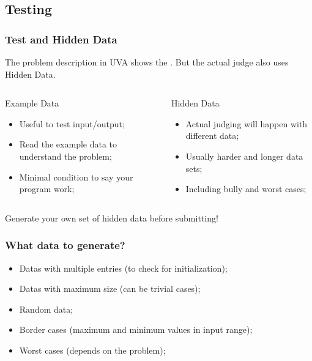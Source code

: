 \documentclass{beamer}
\begin{document}
\subsection{Testing}
\begin{frame}
  \frametitle{Test and Hidden Data}

  The problem description in UVA shows the . But the actual judge also uses \alert{Hidden Data}. 

  \begin{columns}
    \begin{exampleblock}{Example Data}
      \begin{itemize}
      \item Useful to test input/output;
      \item Read the example data to understand the problem;
      \item Minimal condition to say your program work;
      \end{itemize}
    \end{exampleblock}
    \begin{alertblock}{Hidden Data}
      \begin{itemize}
      \item Actual judging will happen with different data;
      \item Usually harder and longer data sets;
      \item Including bully and worst cases;
      \end{itemize}
    \end{alertblock}
  \end{columns}
  
  \medskip

  Generate your own set of hidden data before submitting!
\end{frame}

\begin{frame}
  \frametitle{What data to generate?}

  \begin{itemize}
  \item Datas with multiple entries (to check for initialization);
  \item Datas with maximum size (can be trivial cases);
  \item Random data;
  \item Border cases (maximum and minimum values in input range);
  \item Worst cases (depends on the problem);
  \end{itemize}
\end{frame}
\end{document}
